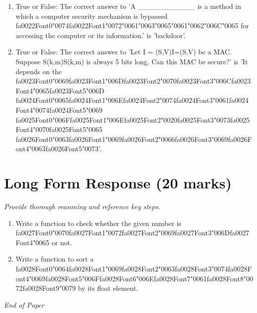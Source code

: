 \documentclass[12pt]{article}
\begin{document}
\begin{enumerate}[label=\arabic*.]
\item True or False: The correct answer to 'A \_\_\_\_\_\_\_\_\_\_\_ is a method in which a computer security mechanism is bypassed {\csname fa0022Font0\endcsname\char"0074}{\csname fa0022Font1\endcsname\char"0072}{\char"0061}{\char"0063}{\char"0065}{\char"0061}{\char"0062}{\char"006C}{\char"0065} for accessing the computer or its information.' is 'backdoor'.
\item True or False: The correct answer to 'Let I = (S,V)I=(S,V) be a MAC. Suppose S(k,m)S(k,m) is always 5 bits long. Can this MAC be secure?' is 'It depends on the {\csname fa0023Font0\endcsname\char"0069}{\csname fa0023Font1\endcsname\char"006D}{\csname fa0023Font2\endcsname\char"0070}{\csname fa0023Font3\endcsname\char"006C}{\csname fa0023Font4\endcsname\char"0065}{\csname fa0023Font5\endcsname\char"006D} {\csname fa0024Font0\endcsname\char"0065}{\csname fa0024Font1\endcsname\char"006E}{\csname fa0024Font2\endcsname\char"0074}{\csname fa0024Font3\endcsname\char"0061}{\csname fa0024Font4\endcsname\char"0074}{\csname fa0024Font5\endcsname\char"0069} {\csname fa0025Font0\endcsname\char"006F}{\csname fa0025Font1\endcsname\char"006E}{\csname fa0025Font2\endcsname\char"0020}{\csname fa0025Font3\endcsname\char"0073}{\csname fa0025Font4\endcsname\char"0070}{\csname fa0025Font5\endcsname\char"0065} {\csname fa0026Font0\endcsname\char"0063}{\csname fa0026Font1\endcsname\char"0069}{\csname fa0026Font2\endcsname\char"0066}{\csname fa0026Font3\endcsname\char"0069}{\csname fa0026Font4\endcsname\char"0063}{\csname fa0026Font5\endcsname\char"0073}'.
\end{enumerate}

\section*{Long Form Response (20 marks)}
\textit{Provide thorough reasoning and reference key steps.}
\begin{enumerate}[label=\arabic*.]
\item Write a function to check whether the given number is {\csname fa0027Font0\endcsname\char"0070}{\csname fa0027Font1\endcsname\char"0072}{\csname fa0027Font2\endcsname\char"0069}{\csname fa0027Font3\endcsname\char"006D}{\csname fa0027Font4\endcsname\char"0065} or not.
\item Write a function to sort a {\csname fa0028Font0\endcsname\char"0064}{\csname fa0028Font1\endcsname\char"0069}{\csname fa0028Font2\endcsname\char"0063}{\csname fa0028Font3\endcsname\char"0074}{\csname fa0028Font4\endcsname\char"0069}{\csname fa0028Font5\endcsname\char"006F}{\csname fa0028Font6\endcsname\char"006E}{\csname fa0028Font7\endcsname\char"0061}{\csname fa0028Font8\endcsname\char"0072}{\csname fa0028Font9\endcsname\char"0079} by its float element.
\end{enumerate}

\vfill
\noindent\textit{End of Paper}
\end{document}
